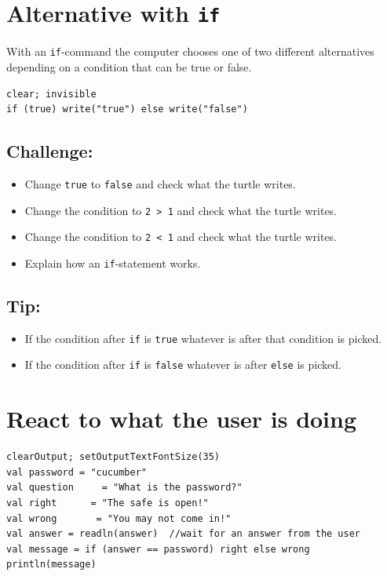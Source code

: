 \chapter{Alternative with \lstinline{if}}With an \lstinline{if}-command the computer chooses one of two different alternatives depending on a condition that can be true or false.

\begin{lstlisting}[basicstyle={\ttfamily\fontsize{20}{24}\selectfont},numbers=none]
clear; invisible
if (true) write("true") else write("false")
\end{lstlisting}
        
\section*{\color{BrickRed}Challenge:}


\begin{itemize}

\item {Change \lstinline{true} to \lstinline{false} and check what the turtle writes.}
\item {Change the condition to \lstinline{2 > 1} and check what the turtle writes.}
\item {Change the condition to \lstinline{2 < 1} and check what the turtle writes.}
\item {Explain how an \lstinline{if}-statement works.}

\end{itemize}


\section*{\color{OliveGreen}Tip:}


\begin{itemize}

\item {If the condition after  \lstinline{if} is \lstinline{true} whatever is after that condition is picked.}
\item {If the condition after  \lstinline{if} is \lstinline{false} whatever is after \lstinline{else} is picked.}

\end{itemize}


\chapter{React to what the user is doing}
\begin{lstlisting}[basicstyle={\ttfamily\fontsize{20}{24}\selectfont},numbers=none]
clearOutput; setOutputTextFontSize(35)
val password = "cucumber"
val question     = "What is the password?"
val right      = "The safe is open!"
val wrong       = "You may not come in!"
val answer = readln(answer)  //wait for an answer from the user
val message = if (answer == password) right else wrong
println(message)
\end{lstlisting}
        
